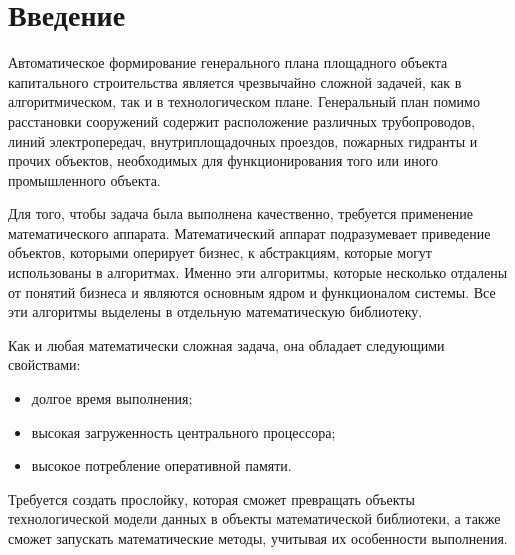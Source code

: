 \section*{\Large{Введение}}
Автоматическое формирование генерального плана площадного объекта капитального строительства является чрезвычайно
сложной задачей, как в алгоритмическом, так и в технологическом плане.
Генеральный план помимо расстановки сооружений содержит расположение различных трубопроводов, линий электропередач,
внутриплощадочных проездов, пожарных гидранты и прочих объектов, необходимых для функционирования того или иного
промышленного объекта.

Для того, чтобы задача была выполнена качественно, требуется применение математического аппарата. Математический
аппарат подразумевает приведение объектов, которыми оперирует бизнес, к абстракциям,
которые могут использованы в алгоритмах. Именно эти алгоритмы, которые несколько отдалены от понятий бизнеса и являются
основным ядром и функционалом системы. Все эти алгоритмы выделены в отдельную математическую библиотеку.

Как и любая математически сложная задача, она обладает следующими свойствами:
\begin{itemize}
    \item долгое время выполнения;
    \item высокая загруженность центрального процессора;
    \item высокое потребление оперативной памяти.
\end{itemize}

Требуется создать прослойку, которая сможет превращать объекты технологической модели данных в объекты математической
библиотеки, а также сможет запускать математические методы, учитывая их особенности выполнения.
